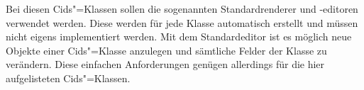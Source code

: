 Bei diesen Cids"=Klassen sollen die sogenannten Standardrenderer und -editoren verwendet werden. Diese werden für jede Klasse automatisch erstellt und müssen nicht eigens implementiert werden.
Mit dem Standardeditor ist es möglich neue Objekte einer Cids"=Klasse anzulegen und sämtliche Felder der Klasse zu verändern.
Diese einfachen Anforderungen genügen allerdings für die hier aufgelisteten Cids"=Klassen.


